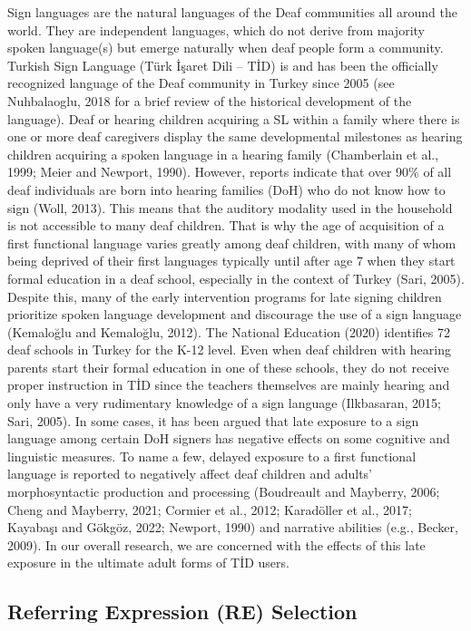 \documentclass[]{elsarticle} %
\begin{document}
Sign languages are the natural languages of the Deaf communities all
around the world. They are independent languages, which do not derive
from majority spoken language(s) but emerge naturally when deaf people
form a community. Turkish Sign Language (Türk İşaret Dili -- TİD) is and
has been the officially recognized language of the Deaf community in
Turkey since 2005 (see Nuhbalaoglu, 2018 for a brief review of the
historical development of the language). Deaf or hearing children
acquiring a SL within a family where there is one or more deaf
caregivers display the same developmental milestones as hearing children
acquiring a spoken language in a hearing family (Chamberlain et al.,
1999; Meier and Newport, 1990). However, reports indicate that over 90\%
of all deaf individuals are born into hearing families (DoH) who do not
know how to sign (Woll, 2013). This means that the auditory modality
used in the household is not accessible to many deaf children. That is
why the age of acquisition of a first functional language varies greatly
among deaf children, with many of whom being deprived of their first
languages typically until after age 7 when they start formal education
in a deaf school, especially in the context of Turkey (Sari, 2005).
Despite this, many of the early intervention programs for late signing
children prioritize spoken language development and discourage the use
of a sign language (Kemaloğlu and Kemaloğlu, 2012). The National
Education (2020) identifies 72 deaf schools in Turkey for the K-12
level. Even when deaf children with hearing parents start their formal
education in one of these schools, they do not receive proper
instruction in TİD since the teachers themselves are mainly hearing and
only have a very rudimentary knowledge of a sign language (Ilkbasaran,
2015; Sari, 2005). In some cases, it has been argued that late exposure
to a sign language among certain DoH signers has negative effects on
some cognitive and linguistic measures. To name a few, delayed exposure
to a first functional language is reported to negatively affect deaf
children and adults' morphosyntactic production and processing
(Boudreault and Mayberry, 2006; Cheng and Mayberry, 2021; Cormier et
al., 2012; Karadöller et al., 2017; Kayabaşı and Gökgöz, 2022; Newport,
1990) and narrative abilities (e.g., Becker, 2009). In our overall
research, we are concerned with the effects of this late exposure in the
ultimate adult forms of TİD users.

\hypertarget{referring-expression-re-selection}{%
\subsection{Referring Expression (RE)
Selection}\label{referring-expression-re-selection}}
\end{document}
